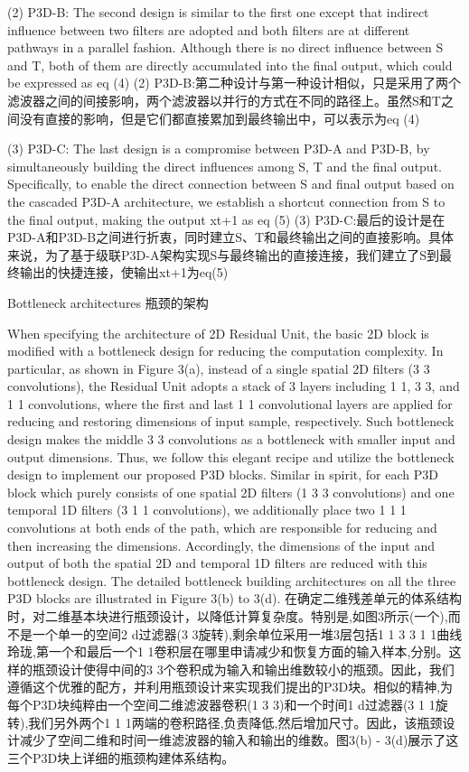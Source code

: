 (2) P3D-B: The second design is similar to the first one except that indirect influence between two filters are adopted and both filters are at different pathways in a parallel fashion. Although there is no direct influence between S and T, both of them are directly accumulated into the final  output, which could be expressed as
eq (4)
(2) P3D-B:第二种设计与第一种设计相似，只是采用了两个滤波器之间的间接影响，两个滤波器以并行的方式在不同的路径上。虽然S和T之间没有直接的影响，但是它们都直接累加到最终输出中，可以表示为eq (4)

(3) P3D-C: The last design is a compromise between P3D-A and P3D-B, by simultaneously building the direct influences among S, T and the final output. Specifically, to enable the direct connection between S and final output based on the cascaded P3D-A architecture, we establish a shortcut connection from S to the final output, making the output xt+1 as
eq (5)
(3) P3D-C:最后的设计是在P3D-A和P3D-B之间进行折衷，同时建立S、T和最终输出之间的直接影响。具体来说，为了基于级联P3D-A架构实现S与最终输出的直接连接，我们建立了S到最终输出的快捷连接，使输出xt+1为eq(5)

Bottleneck architectures
瓶颈的架构

When specifying the architecture of 2D Residual Unit, the basic 2D block is modified with a bottleneck design for reducing the computation complexity. In particular, as shown in Figure 3(a), instead of a single spatial 2D filters (3 3 convolutions), the Residual Unit adopts a stack of 3 layers including 1 1, 3 3, and 1 1 convolutions, where the first and last 1 1 convolutional layers are applied for reducing and restoring dimensions of input sample, respectively. Such bottleneck design makes the middle 3 3 convolutions as a bottleneck with smaller input and output dimensions. Thus, we follow this elegant recipe and utilize the bottleneck design to implement our proposed P3D blocks. Similar in spirit, for each P3D block which purely consists of one spatial 2D filters (1 3 3 convolutions) and one temporal 1D filters (3 1 1 convolutions), we additionally place two 1 1 1 convolutions at both ends of the path, which are responsible for reducing and then increasing the dimensions. Accordingly, the dimensions of the input and output of both the spatial 2D and temporal 1D filters are reduced with this bottleneck design. The detailed bottleneck building architectures on all the three P3D blocks are illustrated in Figure 3(b) to 3(d).
在确定二维残差单元的体系结构时，对二维基本块进行瓶颈设计，以降低计算复杂度。特别是,如图3所示(一个),而不是一个单一的空间2 d过滤器(3 3旋转),剩余单位采用一堆3层包括1 1 3 3 1 1曲线玲珑,第一个和最后一个1 1卷积层在哪里申请减少和恢复方面的输入样本,分别。这样的瓶颈设计使得中间的3 3个卷积成为输入和输出维数较小的瓶颈。因此，我们遵循这个优雅的配方，并利用瓶颈设计来实现我们提出的P3D块。相似的精神,为每个P3D块纯粹由一个空间二维滤波器卷积(1 3 3)和一个时间1 d过滤器(3 1 1旋转),我们另外两个1 1 1两端的卷积路径,负责降低,然后增加尺寸。因此，该瓶颈设计减少了空间二维和时间一维滤波器的输入和输出的维数。图3(b) - 3(d)展示了这三个P3D块上详细的瓶颈构建体系结构。


